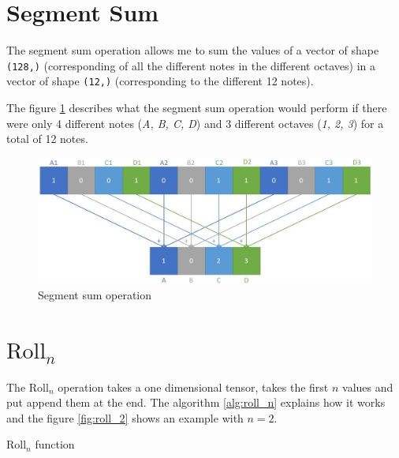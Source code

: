 \documentclass[12pt]{report}
\begin{document}
\section{Segment Sum}
\label{appendix:segment_sum}

The segment sum operation allows me to sum the values of a vector of shape \texttt{(128,)} (corresponding of all the different notes in the different octaves) in a vector of shape \texttt{(12,)} (corresponding to the different 12 notes).

The figure \ref{fig:segment_sum} describes what the segment sum operation would perform if there were only 4 different notes (\textit{A, B, C, D}) and 3 different octaves (\textit{1, 2, 3}) for a total of 12 notes.

\begin{figure}[ht]
    \centering
    \includegraphics[width=\textwidth]{images/nn/tensor/segment_sum.jpg}
    \caption{Segment sum operation}
    \label{fig:segment_sum}
\end{figure}

\section{$\text{Roll}_n$}
\label{appendix:roll_n}

The $\text{Roll}_n$ operation takes a one dimensional tensor, takes the first $n$ values and put append them at the end.
The algorithm \ref{alg:roll_n} explains how it works and the figure \ref{fig:roll_2} shows an example with $n=2$.

\begin{algorithm}
    \begin{algorithmic}[1]
        \Statex
            \EndFor
            \State {}
        \EndFunction
        \end{algorithmic}
    \caption{$\text{Roll}_n$ function}
    \label{alg:roll_n}
\end{algorithm}
\end{document}
